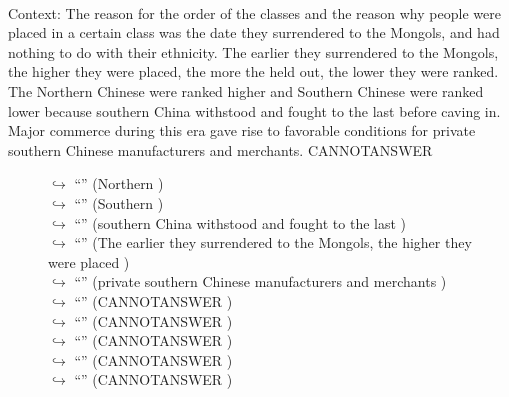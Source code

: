 \documentclass[11pt,a4paper, onecolumn]{article}
\begin{document}
\\ Context: The reason for the order of the classes and the reason why people were placed in a certain class was the date they surrendered to the Mongols, and had nothing to do with their ethnicity. The earlier they surrendered to the Mongols, the higher they were placed, the more the held out, the lower they were ranked. The Northern Chinese were ranked higher and Southern Chinese were ranked lower because southern China withstood and fought to the last before caving in. Major commerce during this era gave rise to favorable conditions for private southern Chinese manufacturers and merchants. CANNOTANSWER

\begin{figure}[t] \small \begin{tcolorbox}[boxsep=0pt,left=5pt,right=0pt,top=2pt,colback = yellow!5] \begin{dialogue}
 \small 
\colorbox{pink!25}{$\hookrightarrow$}
{ ``'' (Northern ) }
\\
\colorbox{pink!25}{$\hookrightarrow$}
{ ``'' (Southern ) }
\\
\colorbox{pink!25}{$\hookrightarrow$}
{ ``'' (southern China withstood and fought to the last ) }
\\
\colorbox{pink!25}{$\hookrightarrow$}
{ ``'' (The earlier they surrendered to the Mongols, the higher they were placed ) }
\\
\colorbox{pink!25}{$\hookrightarrow$}
{ ``'' (private southern Chinese manufacturers and merchants ) }
\\
\colorbox{pink!25}{$\hookrightarrow$}
{ ``'' (CANNOTANSWER ) }
\\
\colorbox{pink!25}{$\hookrightarrow$}
{ ``'' (CANNOTANSWER ) }
\\
\colorbox{pink!25}{$\hookrightarrow$}
{ ``'' (CANNOTANSWER ) }
\\
\colorbox{pink!25}{$\hookrightarrow$}
{ ``'' (CANNOTANSWER ) }
\\
\colorbox{pink!25}{$\hookrightarrow$}
{ ``'' (CANNOTANSWER ) }
\\
 \end{dialogue}\end{tcolorbox}\end{figure}
\end{document}
